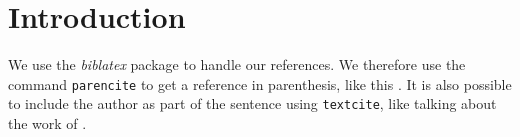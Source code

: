 \chapter{Introduction}

We use the \emph{biblatex} package to handle our references.  We therefore use the
command \texttt{parencite} to get a reference in parenthesis, like this
\parencite{heisenberg2015}.  It is also possible to include the author
as part of the sentence using \texttt{textcite}, like talking about
the work of \textcite{einstein2016}.

\Blindtext